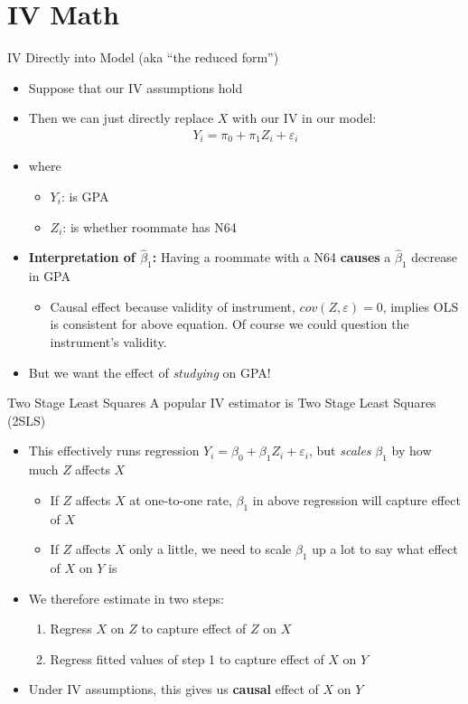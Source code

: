 \documentclass[aspectratio=169,11pt]{beamer}
\begin{document}
\section{IV Math}
\begin{frame}{IV Directly into Model (aka ``the reduced form'')}
\begin{itemize}
\item Suppose that our IV assumptions hold
\medskip
\item Then we can just directly replace $X$ with our IV in our model:
\begin{align*}
Y_i=\pi_0 + \pi_1 Z_i + \varepsilon_i
\end{align*}
\item where
\begin{itemize}
\item $Y_i$: is GPA
\item $Z_i$: is whether roommate has N64
\end{itemize}
\medskip
\item \textbf{Interpretation of $\hat{\beta}_1$:} Having a roommate with a N64 \textbf{causes} a $\hat{\beta}_1$ decrease in GPA
\begin{itemize}
\item Causal effect because validity of instrument, $cov(Z,\varepsilon)=0$, implies OLS is consistent for above equation.
Of course we could question the instrument's validity.
\end{itemize}
\medskip
\item But we want the effect of \emph{studying} on GPA!
\end{itemize}
\end{frame}

\begin{frame}{Two Stage Least Squares}
A popular IV estimator is Two Stage Least Squares (2SLS)
\begin{itemize}
\item This effectively runs regression $Y_i=\beta_0 + \beta_1 Z_i + \varepsilon_i$, but \emph{scales} $\beta_1$ by how much $Z$ affects $X$
\begin{itemize}
\item If $Z$ affects $X$ at one-to-one rate, $\beta_1$ in above regression will capture effect of $X$
\item If $Z$ affects $X$ only a little, we need to scale $\beta_1$ up a lot to say what effect of $X$ on $Y$ is
\end{itemize}
\medskip
\item We therefore estimate in two steps:
\begin{enumerate}
\item Regress $X$ on $Z$ to capture effect of $Z$ on $X$
\item Regress fitted values of step 1 to capture effect of $X$ on $Y$
\end{enumerate}
\smallskip
\item Under IV assumptions, this gives us \textbf{causal} effect of $X$ on $Y$
\end{itemize}
\end{frame}
\end{document}
